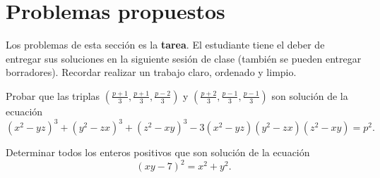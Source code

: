 \section{Problemas propuestos}

Los problemas de esta sección es la \textbf{tarea}.
El estudiante tiene el deber de entregar sus soluciones en la siguiente sesión de clase (también se pueden entregar borradores).
Recordar realizar un trabajo claro, ordenado y limpio.

\begin{exercise}
    Probar que las triplas $\left(\frac{p + 1}{3}, \frac{p + 1}{3}, \frac{p - 2}{3}\right)$ y $\left(\frac{p + 2}{3}, \frac{p - 1}{3}, \frac{p - 1}{3}\right)$ son
    solución de la ecuación
    \[
        (x^2 - yz)^3 + (y^2 - zx)^3 + (z^2 - xy)^3 - 3(x^2 - yz)(y^2 - zx)(z^2 - xy) = p^2.
    \]
\end{exercise}

\begin{exercise}
    Determinar todos los enteros positivos que son solución de la ecuación
    \[
        (xy - 7)^2 = x^2 + y^2.
    \]
\end{exercise}